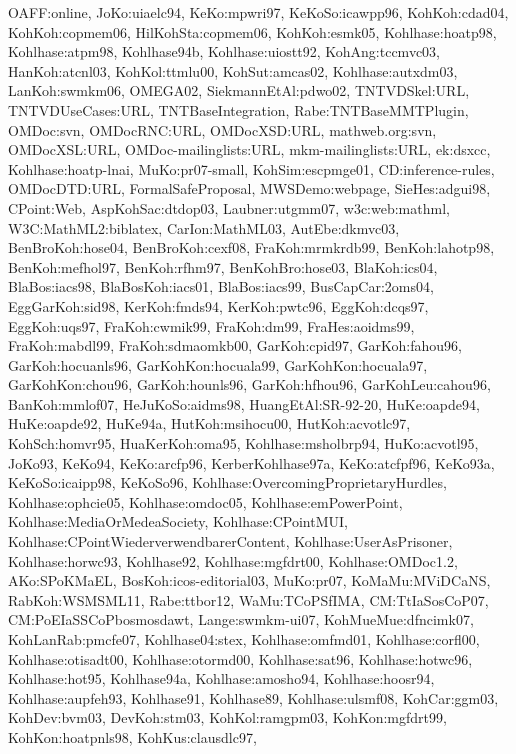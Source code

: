{OAFF:online,%
JoKo:uiaelc94,%
KeKo:mpwri97,%
KeKoSo:icawpp96,%
KohKoh:cdad04,%
KohKoh:copmem06,%
HilKohSta:copmem06,%
KohKoh:esmk05,%
Kohlhase:hoatp98,%
Kohlhase:atpm98,%
Kohlhase94b,%
Kohlhase:uiostt92,%
KohAng:tccmvc03,%
HanKoh:atcnl03,%
KohKol:ttmlu00,%
KohSut:amcas02,%
Kohlhase:autxdm03,%
LanKoh:swmkm06,%
OMEGA02,%
SiekmannEtAl:pdwo02,%
TNTVDSkel:URL,%
TNTVDUseCases:URL,%
TNTBaseIntegration,%
Rabe:TNTBaseMMTPlugin,%
OMDoc:svn,%
OMDocRNC:URL,%
OMDocXSD:URL,%
mathweb.org:svn,%
OMDocXSL:URL,%
OMDoc-mailinglists:URL,%
mkm-mailinglists:URL,%
ek:dsxcc,%
Kohlhase:hoatp-lnai,%
MuKo:pr07-small,%
KohSim:escpmge01,%
CD:inference-rules,%
OMDocDTD:URL,%
FormalSafeProposal,%
MWSDemo:webpage,%
SieHes:adgui98,%
CPoint:Web,%
AspKohSac:dtdop03,%
Laubner:utgmm07,%
w3c:web:mathml,%
W3C:MathML2:biblatex,%
CarIon:MathML03,%
AutEbe:dkmvc03,%
BenBroKoh:hose04,%
BenBroKoh:cexf08,%
FraKoh:mrmkrdb99,%
BenKoh:lahotp98,%
BenKoh:mefhol97,%
BenKoh:rfhm97,%
BenKohBro:hose03,%
BlaKoh:ics04,%
BlaBos:iacs98,%
BlaBosKoh:iacs01,%
BlaBos:iacs99,%
BusCapCar:2oms04,%
EggGarKoh:sid98,%
KerKoh:fmds94,%
KerKoh:pwtc96,%
EggKoh:dcqs97,%
EggKoh:uqs97,%
FraKoh:cwmik99,%
FraKoh:dm99,%
FraHes:aoidms99,%
FraKoh:mabdl99,%
FraKoh:sdmaomkb00,%
GarKoh:cpid97,%
GarKoh:fahou96,%
GarKoh:hocuanls96,%
GarKohKon:hocuala99,%
GarKohKon:hocuala97,%
GarKohKon:chou96,%
GarKoh:hounls96,%
GarKoh:hfhou96,%
GarKohLeu:cahou96,%
BanKoh:mmlof07,%
HeJuKoSo:aidms98,%
HuangEtAl:SR-92-20,%
HuKe:oapde94,%
HuKe:oapde92,%
HuKe94a,%
HutKoh:msihocu00,%
HutKoh:acvotlc97,%
KohSch:homvr95,%
HuaKerKoh:oma95,%
Kohlhase:msholbrp94,%
HuKo:acvotl95,%
JoKo93,%
KeKo94,%
KeKo:arcfp96,%
KerberKohlhase97a,%
KeKo:atcfpf96,%
KeKo93a,%
KeKoSo:icaipp98,%
KeKoSo96,%
Kohlhase:OvercomingProprietaryHurdles,%
Kohlhase:ophcie05,%
Kohlhase:omdoc05,%
Kohlhase:emPowerPoint,%
Kohlhase:MediaOrMedeaSociety,%
Kohlhase:CPointMUI,%
Kohlhase:CPointWiederverwendbarerContent,%
Kohlhase:UserAsPrisoner,%
Kohlhase:horwc93,%
Kohlhase92,%
Kohlhase:mgfdrt00,%
Kohlhase:OMDoc1.2,%
AKo:SPoKMaEL,%
BosKoh:icos-editorial03,%
MuKo:pr07,%
KoMaMu:MViDCaNS,%
RabKoh:WSMSML11,%
Rabe:ttbor12,%
WaMu:TCoPSfIMA,%
CM:TtIaSosCoP07,%
CM:PoEIaSSCoPbosmosdawt,%
Lange:swmkm-ui07,%
KohMueMue:dfncimk07,%
KohLanRab:pmcfe07,%
Kohlhase04:stex,%
Kohlhase:omfmd01,%
Kohlhase:corfl00,%
Kohlhase:otisadt00,%
Kohlhase:otormd00,%
Kohlhase:sat96,%
Kohlhase:hotwc96,%
Kohlhase:hot95,%
Kohlhase94a,%
Kohlhase:amosho94,%
Kohlhase:hoosr94,%
Kohlhase:aupfeh93,%
Kohlhase91,%
Kohlhase89,%
Kohlhase:ulsmf08,%
KohCar:ggm03,%
KohDev:bvm03,%
DevKoh:stm03,%
KohKol:ramgpm03,%
KohKon:mgfdrt99,%
KohKon:hoatpnls98,%
KohKus:clausdlc97,%
}
